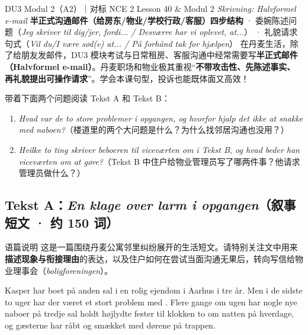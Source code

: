 {DU3 Modul 2（A2）｜对标 NCE 2 Lesson 40 \& Modul 2 \textit{Skrivning: Halvformel e-mail}}
{\textbf{半正式沟通邮件（给房东/物业/学校行政/客服）四步结构} · 委婉陈述问题（\textit{Jeg skriver til dig/jer, fordi... / Desværre har vi oplevet, at...}） · 礼貌请求句式（\textit{Vil du/I være sød(e) at... / På forhånd tak for hjælpen}）}
{在丹麦生活，除了给朋友发邮件，DU3 模块考试与日常租房、客服沟通中经常需要写\textbf{半正式邮件（Halvformel e-mail）}。丹麦职场和物业极其重视“\textbf{不带攻击性、先陈述事实、再礼貌提出可操作请求}”。学会本课句型，投诉也能既体面又高效！}

\begin{foerduleaeser}
带着下面两个问题阅读 Tekst A 和 Tekst B：
\begin{enumerate}
  \item \textit{Hvad var de to store problemer i opgangen, og hvorfor hjalp det ikke at snakke med naboen?}（楼道里的两个大问题是什么？为什么找邻居沟通也没用？）
  \item \textit{Hvilke to ting skriver beboeren til viceværten om i Tekst B, og hvad beder han viceværten om at gøre?}（Tekst B 中住户给物业管理员写了哪两件事？他请求管理员做什么？）
\end{enumerate}
\end{foerduleaeser}


\subsection*{Tekst A：\textit{En klage over larm i opgangen}（叙事短文 · 约 150 词）}

\begin{tipbox}{语篇说明}
这是一篇围绕丹麦公寓邻里纠纷展开的生活短文。请特别关注文中用来\textbf{\color{NCDNavy}描述现象与衔接理由}的表达，以及住户如何在尝试当面沟通无果后，转向写信给物业理事会（\textit{boligforeningen}）。
\end{tipbox}

Kasper har boet på anden sal i en rolig ejendom i Aarhus i tre år. Men i de sidste to uger har der været et stort problem med . Flere gange om ugen har nogle nye naboer på tredje sal holdt højlydte fester til klokken to om natten på hverdage, og gæsterne har råbt og smækket med dørene på trappen.

